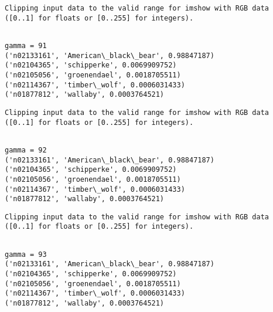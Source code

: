 \documentclass[11pt]{article}
\begin{document}
    \begin{Verbatim}[commandchars=\\\{\}]
Clipping input data to the valid range for imshow with RGB data ([0..1] for floats or [0..255] for integers).

    \end{Verbatim}

    \begin{Verbatim}[commandchars=\\\{\}]

gamma = 91
('n02133161', 'American\_black\_bear', 0.98847187)
('n02104365', 'schipperke', 0.0069909752)
('n02105056', 'groenendael', 0.0018705511)
('n02114367', 'timber\_wolf', 0.0006031433)
('n01877812', 'wallaby', 0.0003764521)

    \end{Verbatim}

    \begin{Verbatim}[commandchars=\\\{\}]
Clipping input data to the valid range for imshow with RGB data ([0..1] for floats or [0..255] for integers).

    \end{Verbatim}

    \begin{Verbatim}[commandchars=\\\{\}]

gamma = 92
('n02133161', 'American\_black\_bear', 0.98847187)
('n02104365', 'schipperke', 0.0069909752)
('n02105056', 'groenendael', 0.0018705511)
('n02114367', 'timber\_wolf', 0.0006031433)
('n01877812', 'wallaby', 0.0003764521)

    \end{Verbatim}

    \begin{Verbatim}[commandchars=\\\{\}]
Clipping input data to the valid range for imshow with RGB data ([0..1] for floats or [0..255] for integers).

    \end{Verbatim}

    \begin{Verbatim}[commandchars=\\\{\}]

gamma = 93
('n02133161', 'American\_black\_bear', 0.98847187)
('n02104365', 'schipperke', 0.0069909752)
('n02105056', 'groenendael', 0.0018705511)
('n02114367', 'timber\_wolf', 0.0006031433)
('n01877812', 'wallaby', 0.0003764521)

    \end{Verbatim}
\end{document}
